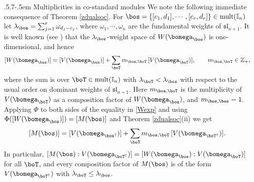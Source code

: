 \documentclass[11pt,reqno]{amsart}
\makeatletter
\theoremstyle{definition} \newtheorem*{defn}{Definition}
\theoremstyle{definition}
\numberwithin{equation}{section}
\newcommand{\lie}[1]{\mathfrak{#1}}
\def\subsection{\def\@secnumfont{\bfseries}\@startsection{subsection}{2}%
  {\parindent}{.5\linespacing\@plus.7\linespacing}{-.5em}%
  {\normalfont\bfseries}}
\makeatother
\begin{document}
\subsection{Multiplicities in co-standard modules}\label{multdual} We note the following immediate consequence of Theorem \ref{zdualsoc}. For $\bos=\{[c_1,d_1],\cdots,[c_r,d_r]\}\in{\rm mult}(\mathbb I_n)$ let
$\lambda_\bos=\sum_{j=1}^r\omega_{d_j-c_j}$, where $\omega_1,\cdots,\omega_n$ are the fundamental weights of
$\lie{sl}_{n+1}$. It is well known (see \cite{CP01}) that the $\lambda_\bos$-weight space of $W(\bomega_\bos)$ is
one-dimensional, and hence
\begin{equation}\label{Wexp}[W(\bomega_\bos)]=[V(\bomega_\bos)]+\sum_{\boT}m_{\bos,\boT}\,[V(\bomega_{\boT})],\qquad m_{\bos,\boT}\in\mathbb Z_+,\end{equation}
where the sum is over $\boT\in{\rm mult}(\mathbb I_n)$ with $\lambda_{\boT}<\lambda_\bos$ with respect to the usual
order on dominant weights of $\lie{sl}_{n+1}$. Here $m_{\bos,\boT}$ is the multiplicity of $V(\bomega_\boT)$
as a composition factor of $W(\bomega_\bos)$, and $m_{\bos,\bos}=1$. Applying $\Phi$ to both sides of the equality in \eqref{Wexp} and using $\Phi([W(\bomega_\bos)])=[M(\bos)]$ and Theorem \ref{zdualsoc}(ii) we get  $$[M(\bos)]=[V(\bomega_{\bos^\dagger})]+\sum_{\boT}m_{\bos,\boT}\,[V(\bomega_{\boT^\dagger})].$$
In particular, $[M(\bos):V(\bomega_{\boT^\dagger})]=[W(\bomega_\bos):V(\bomega_\boT)]$ for all $\boT$,
and every composition factor of $M(\bos)$ is of the form $V(\bomega_{\boT^\dagger})$ with
$\lambda_\boT\le\lambda_\bos$.
\end{document}

